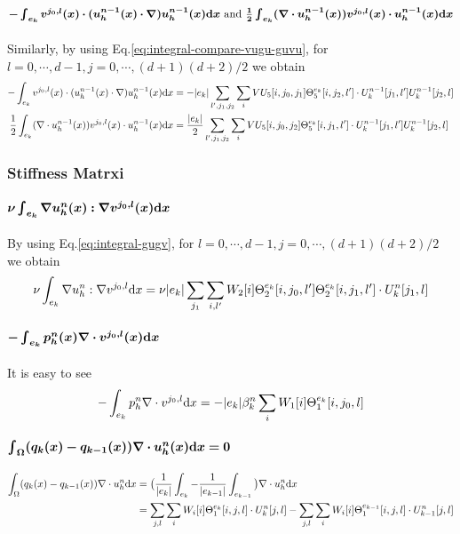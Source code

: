 \paragraph{$\bm{-\int_{e_k}v^{j_0,l}(x)\cdot(u_h^{n-1}(x)\cdot\nabla)
u_h^{n-1}(x)\mathrm{d} x
\text{ and }\frac{1}{2}\int_{e_k}(\nabla\cdot u_h^{n-1}(x))v^{j_0,l}(x)
\cdot u_h^{n-1}(x)\mathrm{d} x}$}
Similarly, by using Eq.\eqref{eq:integral-compare-vugu-guvu}, 
for $l=0,\cdots,d-1,j=0,\cdots,(d+1)(d+2)/2$ we obtain
\begin{equation}
  \begin{split}
    -\int_{e_k} v^{j_0,l}(x)\cdot(u_h^{n-1}(x)\cdot\nabla)u_h^{n-1}(x)\mathrm{d} x
    &= -|e_k|\sum_{l',j_1,j_2}\sum_iVU_5[i,j_0,j_1]\Theta_5^{e_k}[i,j_2,l']\cdot 
    U^{n-1}_k[j_1,l']U^{n-1}_k[j_2,l] \\
    \frac12\int_{e_k}(\nabla\cdot u_h^{n-1}(x))v^{j_0,l}(x)\cdot u_h^{n-1}(x)\mathrm{d} x
    &= \frac{|e_k|}2\sum_{l',j_1,j_2}\sum_i VU_5[i,j_0,j_2]\Theta_5^{e_k}[i,j_1,l']
    \cdot U^{n-1}_k[j_1,l']U^{n-1}_k[j_2,l] 
  \end{split}
\end{equation}

\subsubsection{Stiffness Matrxi}
\paragraph{$\bm{\nu\int_{e_k}\nabla u_h^n(x):\nabla v^{j_0,l}(x)\mathrm{d} x}$} 
By using Eq.\eqref{eq:integral-gugv}, 
for $l=0,\cdots,d-1,j=0,\cdots,(d+1)(d+2)/2$ we obtain
\begin{equation}
    \nu\int_{e_k} \nabla u_h^n:\nabla v^{j_0,l}\mathrm{d} x = \nu|e_k| \sum_{j_1} 
    \sum_{i,l'}W_2[i]\Theta_2^{e_k}[i,j_0,l']\Theta_2^{e_k}[i,j_1,l'] 
    \cdot U^n_k[j_1,l]
\end{equation}

\paragraph{$\bm{-\int_{e_k}p_h^n(x)\nabla\cdot v^{j_0,l}(x)\mathrm{d} x}$}
It is easy to see
\begin{equation}
    -\int_{e_k} p_h^n\nabla\cdot v^{j_0,l}\mathrm{d} x
    = -|e_k| \beta^n_k\sum_i W_1[i] \Theta_1^{e_k}[i,j_0,l]
\end{equation}

\paragraph{$\bm{\int_{\Omega}(q_k(x)-q_{k-1}(x))\nabla\cdot u_h^n(x)\mathrm{d} x=0}$}
\begin{equation}
  \begin{split}
    \int_\Omega(q_k(x)-q_{k-1}(x))\nabla\cdot u_h^n\mathrm{d} x &=
    \big(\frac1{|e_k|}\int_{e_k}-\frac1{|e_{k-1}|}\int_{e_{k-1}}\big)
    \nabla \cdot u_h^n\mathrm{d} x \\
    &= \sum_{j,l}\sum_{i} W_i[i]\Theta_1^{e_k}[i,j,l]\cdot U_k^n[j,l] 
    -\sum_{j,l}\sum_{i} W_i[i]\Theta_1^{e_{k-1}}[i,j,l]\cdot U_{k-1}^n[j,l]
  \end{split}
\end{equation}

